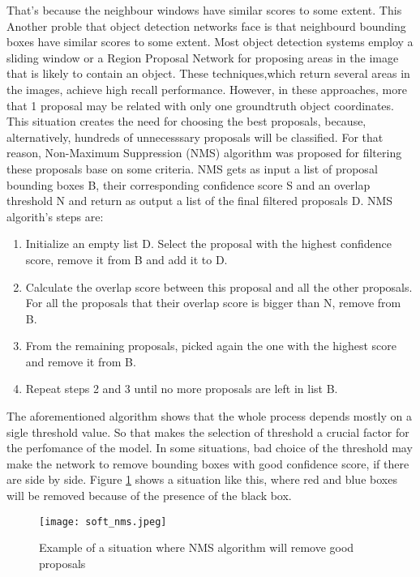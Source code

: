 That's because the neighbour windows have similar scores to some extent. This 
Another proble that object detection networks face is that neighbourd bounding boxes have similar scores to some extent. Most object
detection systems employ a sliding window or a Region Proposal Network for proposing areas in the image that is likely to contain an
object. These techniques,which return several areas in the images, achieve high recall performance. However, in these approaches,
more that 1 proposal may be related with only one groundtruth object coordinates. This situation creates
the need for choosing the best proposals, because, alternatively, hundreds of unnecesssary proposals will be classified. For that
reason, Non-Maximum Suppression (NMS) algorithm was proposed for filtering these proposals base on some criteria. NMS gets as input
a list of proposal bounding boxes B, their corresponding confidence score S and an overlap threshold N and return as output
a list of the final filtered proposals D. NMS algorith's steps are:
\begin{enumerate}
  
\item Initialize an empty list D. Select the proposal with the highest confidence score, remove it from B and add it to D.
\item Calculate the overlap score between this proposal and all the other proposals. For all the proposals that their overlap
  score is bigger than N, remove from B.
\item From the remaining proposals, picked again the one with the highest score and remove it from B.
\item Repeat steps 2 and 3 until no more proposals are left in list B.
\end{enumerate}

The aforementioned algorithm shows that the whole process depends mostly on a sigle threshold value.  So that makes the selection
of threshold a crucial factor for the perfomance of the model. In some situations, bad choice of the threshold may make the network
to remove bounding boxes with good confidence score, if there are side by side. Figure \ref{fig:nms_eg} shows a situation like this,
where red and blue boxes will be removed because of the presence of the black box.
\begin{figure}[h]
  \centering
  \texttt{[image: soft\_nms.jpeg]}
  \caption{Example of a situation where NMS algorithm will remove good proposals}
  \label{fig:nms_eg}
\end{figure}

